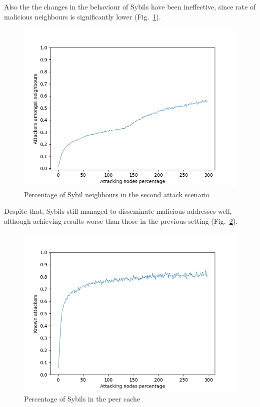 Also the the changes in the behaviour of Sybils have been ineffective, since rate of malicious neighbours is significantly lower (Fig.~\ref{fig:ex-atk-neigh}).\par

\begin{figure}[h!]
	\includegraphics[width=.8\textwidth]{pict/results/ext-hon-atk-neigh.png}
	\centering
	\caption{Percentage of Sybil neighbours in the second attack scenario}
	\label{fig:ex-atk-neigh}
\end{figure}

Despite that, Sybils still managed to disseminate malicious addresses well, although achieving results worse than those in the previous setting (Fig.~\ref{fig:ex-atk-known}).\par

\begin{figure}[h!]
	\includegraphics[width=.8\textwidth]{pict/results/ex-hon-atk-known.png}
	\centering
	\caption{Percentage of Sybils in the peer cache}
	\label{fig:ex-atk-known}
\end{figure}

